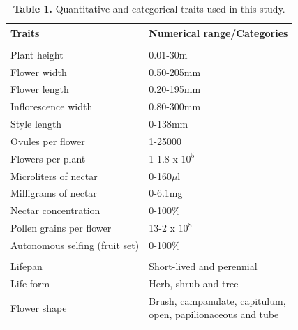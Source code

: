 \documentclass[
  12pt,
  a4paper,
]{article}
\begin{document}
\begin{table}

\caption{\label{tab:unnamed-chunk-1}\textbf{Table 1.} Quantitative and categorical traits used in this study.}
\centering
\fontsize{12}{14}\selectfont
\begin{tabular}[t]{ll}
\toprule
\textbf{Traits} & \textbf{Numerical range/Categories}\\
\midrule
\addlinespace[0.3em]
\multicolumn{2}{l}{\textbf{Quantitative}}\\
\hspace{1em}Plant height & 0.01-30m\\
\hspace{1em}Flower width & 0.50-205mm\\
\hspace{1em}Flower length & 0.20-195mm\\
\hspace{1em}Inflorescence width & 0.80-300mm\\
\hspace{1em}Style length & 0-138mm\\
\hspace{1em}Ovules per flower & 1-25000\\
\hspace{1em}Flowers per plant & 1-1.8 x $10^5$\\
\hspace{1em}Microliters of nectar & 0-160$\mu$l\\
\hspace{1em}Milligrams of nectar & 0-6.1mg\\
\hspace{1em}Nectar concentration & 0-100$\%$\\
\hspace{1em}Pollen grains per flower & 13-2 x $10^8$\\
\hspace{1em}Autonomous selfing (fruit set) & 0-100$\%$\\
\addlinespace[0.3em]
\multicolumn{2}{l}{\textbf{Categorical}}\\
\hspace{1em}Lifepan & Short-lived and perennial\\
\hspace{1em}Life form & Herb, shrub and tree\\
\hspace{1em}Flower shape & \makecell[l]{Brush, campanulate, capitulum,\\ open, papilionaceous and tube}\\

\end{tabular}
\end{table}
\end{document}
